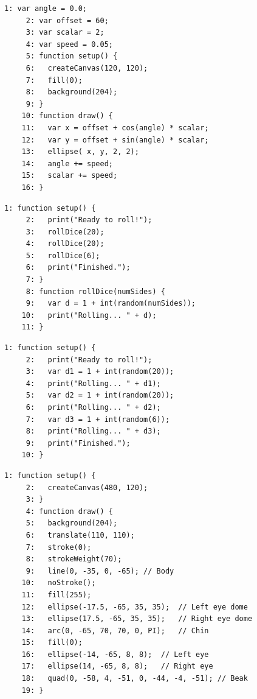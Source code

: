 \documentclass[a4j]{ltjsarticle}
\begin{document}
\vspace{1in}
\begin{lstlisting}[caption=Ex\_08\_15.js]
     1: var angle = 0.0;
     2: var offset = 60;
     3: var scalar = 2;
     4: var speed = 0.05;
     5: function setup() {
     6:   createCanvas(120, 120);
     7:   fill(0);
     8:   background(204);
     9: }
    10: function draw() {
    11:   var x = offset + cos(angle) * scalar;
    12:   var y = offset + sin(angle) * scalar;
    13:   ellipse( x, y, 2, 2);
    14:   angle += speed;
    15:   scalar += speed;
    16: }
\end{lstlisting}
\vspace{1in}
\begin{lstlisting}[caption=Ex\_09\_01.js]
     1: function setup() {
     2:   print("Ready to roll!");
     3:   rollDice(20);
     4:   rollDice(20);
     5:   rollDice(6);
     6:   print("Finished.");
     7: }
     8: function rollDice(numSides) {
     9:   var d = 1 + int(random(numSides));
    10:   print("Rolling... " + d);
    11: }
\end{lstlisting}
\vspace{1in}
\begin{lstlisting}[caption=Ex\_09\_02.js]
     1: function setup() {
     2:   print("Ready to roll!");
     3:   var d1 = 1 + int(random(20));
     4:   print("Rolling... " + d1);
     5:   var d2 = 1 + int(random(20));
     6:   print("Rolling... " + d2);
     7:   var d3 = 1 + int(random(6));
     8:   print("Rolling... " + d3);
     9:   print("Finished.");
    10: }
\end{lstlisting}
\vspace{1in}
\begin{lstlisting}[caption=Ex\_09\_03.js]
     1: function setup() {
     2:   createCanvas(480, 120);
     3: }
     4: function draw() {
     5:   background(204);
     6:   translate(110, 110);
     7:   stroke(0);
     8:   strokeWeight(70);
     9:   line(0, -35, 0, -65); // Body
    10:   noStroke();
    11:   fill(255);
    12:   ellipse(-17.5, -65, 35, 35);  // Left eye dome
    13:   ellipse(17.5, -65, 35, 35);   // Right eye dome
    14:   arc(0, -65, 70, 70, 0, PI);   // Chin
    15:   fill(0);
    16:   ellipse(-14, -65, 8, 8);  // Left eye
    17:   ellipse(14, -65, 8, 8);   // Right eye
    18:   quad(0, -58, 4, -51, 0, -44, -4, -51); // Beak
    19: }
\end{lstlisting}
\vspace{1in}
\end{document}

